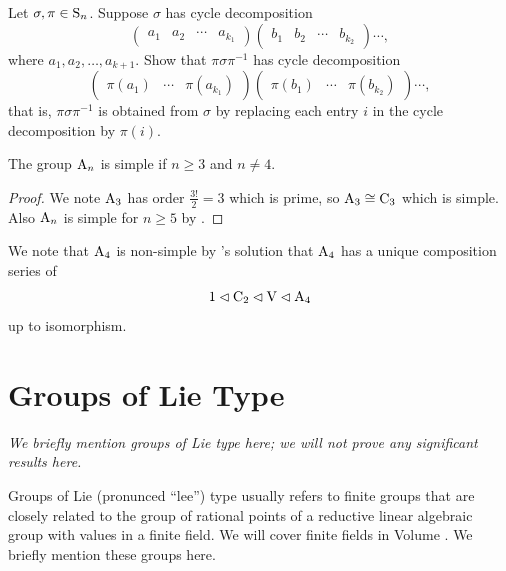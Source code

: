 \begin{exercise}\label{exercise-conjugation-of-permutation-by-another}
    Let $\sigma, \pi \in \mathrm{S}_{n}$. Suppose $\sigma$ has cycle decomposition
    \[
        \begin{pmatrix}a_1&a_2&\cdots&a_{k_1}\end{pmatrix} \begin{pmatrix}b_1&b_2&\cdots&b_{k_2}\end{pmatrix}\cdots,
    \]
    where $a_1, a_2, \dots, a_{k+1}$. Show that $\pi\sigma\pi^{-1}$ has cycle decomposition
    \[
        \begin{pmatrix}\pi(a_1)&\cdots&\pi(a_{k_1})\end{pmatrix} \begin{pmatrix}\pi(b_1)&\cdots&\pi(b_{k_2})\end{pmatrix}\cdots,
    \]
    that is, $\pi\sigma\pi^{-1}$ is obtained from $\sigma$ by replacing each entry $i$ in the cycle decomposition by $\pi(i)$.
\end{exercise}

\begin{corollary}
    The group $\mathrm{A}_{n}$ is simple if $n \geq 3$ and $n \neq 4$.
\end{corollary}
\begin{proof}
    We note $\mathrm{A}_{3}$ has order $\frac{3!}{2} = 3$ which is prime, so $\mathrm{A}_{3} \cong \mathrm{C}_{3}$ which is simple. Also $\mathrm{A}_{n}$ is simple for $n \geq 5$ by .
\end{proof}

We note that $\mathrm{A}_{4}$ is non-simple by 's solution that $\mathrm{A}_{4}$ has a unique composition series of
\[
    1 \lhd \mathrm{C}_{2} \lhd \mathrm{V} \lhd \mathrm{A}_{4}
\]
up to isomorphism.

\section{Groups of Lie Type}
\textit{We briefly mention groups of Lie type here; we will not prove any significant results here.}

Groups of Lie (pronunced ``lee'') type usually refers to finite groups that are closely related to the group of rational points of a reductive linear algebraic group with values in a finite field. We will cover finite fields in Volume . We briefly mention these groups here.

